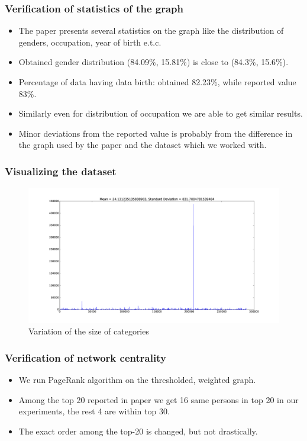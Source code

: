 \documentclass[9pt, compress]{beamer}
\begin{document}
\begin{frame}
	\frametitle{Verification of statistics of the graph}
\begin{itemize}
\item The paper presents several statistics on the graph like the distribution of genders, occupation, year of birth e.t.c.
\item Obtained gender distribution (84.09\%, 15.81\%) is close to (84.3\%, 15.6\%).
\item Percentage of data having data birth: obtained 82.23\%, while reported value 83\%.
\item Similarly even for distribution of occupation we are able to get similar results.
\item Minor deviations from the reported value is probably from the difference in the graph used by the paper and the dataset which we worked with.
\end{itemize}
\end{frame}

\begin{frame}
	\frametitle{Visualizing the dataset}
\begin{figure}
	\caption{Variation of the size of categories}
	\centering
    \includegraphics[width=0.75\linewidth]{img/counts_category.png}
\end{figure}
\end{frame}

\begin{frame}
	\frametitle{Verification of network centrality}
\begin{itemize}
\item We run PageRank algorithm on the thresholded, weighted graph.
\item Among the top 20 reported in paper we get 16 same persons in top 20 in our experiments, the rest 4 are within top 30.
\item The exact order among the top-20 is changed, but not drastically.
\end{itemize}
\end{frame}
\end{document}
